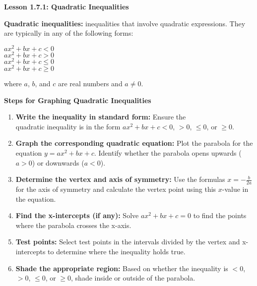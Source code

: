 \vspace*{-5ex}
\begin{center}
\textbf{Lesson 1.7.1: Quadratic Inequalities}
\end{center}

\vspace*{-1ex}

\textbf{Quadratic inequalities:} inequalities that involve quadratic expressions. They are typically in any of the following forms: 
\begin{center}
\setlength{\columnsep}{-3em}
\begin{multicols}{2}				
\( ax^2 + bx + c < 0 \) \\
\( ax^2 + bx + c > 0 \) \\
\( ax^2 + bx + c \leq 0 \) \\
\( ax^2 + bx + c \geq 0 \)
\end{multicols} 
\end{center} 

where \( a \), \( b \), and \( c \) are real numbers and \( a \neq 0 \).

\textbf{Steps for Graphing Quadratic Inequalities}
\begin{enumerate}
    \item \textbf{Write the inequality in standard form:} Ensure the \\quadratic inequality is in the form \( ax^2 + bx + c < 0 \), \( > 0 \), \( \leq 0 \), or \( \geq 0 \).
    \item \textbf{Graph the corresponding quadratic equation:} Plot the parabola for the equation \( y = ax^2 + bx + c \). Identify whether the parabola opens upwards (\( a > 0 \)) or downwards (\( a < 0 \)).
    \item \textbf{Determine the vertex and axis of symmetry:} Use the formulas \( x = -\frac{b}{2a} \) for the axis of symmetry and calculate the vertex point using this \( x \)-value in the equation.
    \item \textbf{Find the x-intercepts (if any):} Solve \( ax^2 + bx + c = 0 \) to find the points where the parabola crosses the x-axis.
    \item \textbf{Test points:} Select test points in the intervals divided by the vertex and x-intercepts to determine where the inequality holds true.
    \item \textbf{Shade the appropriate region:} Based on whether the inequality is \( < 0 \), \( > 0 \), \( \leq 0 \), or \( \geq 0 \), shade inside or outside of the parabola.
\end{enumerate}


